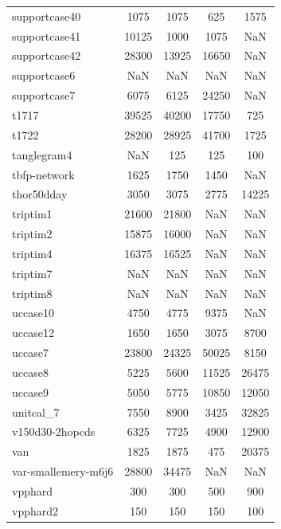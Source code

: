 \begin{longtable}{lcccc}
supportcase40               &     1075 &     1075 &      625 &  1575 \\
supportcase41               &    10125 &     1000 &     1075 &   NaN \\
supportcase42               &    28300 &    13925 &    16650 &   NaN \\
supportcase6                &      NaN &      NaN &      NaN &   NaN \\
supportcase7                &     6075 &     6125 &    24250 &   NaN \\
t1717                       &    39525 &    40200 &    17750 &   725 \\
t1722                       &    28200 &    28925 &    41700 &  1725 \\
tanglegram4                 &      NaN &      125 &      125 &   100 \\
tbfp-network                &     1625 &     1750 &     1450 &   NaN \\
thor50dday                  &     3050 &     3075 &     2775 & 14225 \\
triptim1                    &    21600 &    21800 &      NaN &   NaN \\
triptim2                    &    15875 &    16000 &      NaN &   NaN \\
triptim4                    &    16375 &    16525 &      NaN &   NaN \\
triptim7                    &      NaN &      NaN &      NaN &   NaN \\
triptim8                    &      NaN &      NaN &      NaN &   NaN \\
uccase10                    &     4750 &     4775 &     9375 &   NaN \\
uccase12                    &     1650 &     1650 &     3075 &  8700 \\
uccase7                     &    23800 &    24325 &    50025 &  8150 \\
uccase8                     &     5225 &     5600 &    11525 & 26475 \\
uccase9                     &     5050 &     5775 &    10850 & 12050 \\
unitcal\_7                   &     7550 &     8900 &     3425 & 32825 \\
v150d30-2hopcds             &     6325 &     7725 &     4900 & 12900 \\
van                         &     1825 &     1875 &      475 & 20375 \\
var-smallemery-m6j6         &    28800 &    34475 &      NaN &   NaN \\
vpphard                     &      300 &      300 &      500 &   900 \\
vpphard2                    &      150 &      150 &      150 &   100 \\
\end{longtable}
